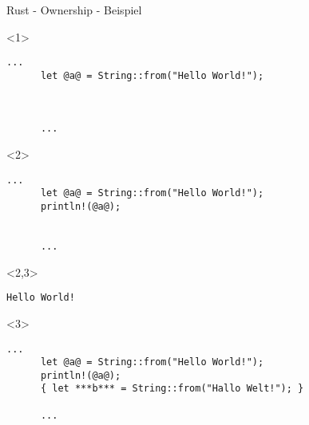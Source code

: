 

\lstset{showstringspaces=true,columns=fullflexible,keepspaces=true}

\begin{frame}[fragile]{Rust - Ownership - Beispiel}



  \begin{onlyenv}<1> {
    \begin{lstlisting}[frame=single,style=base]
      ...
      let @a@ = String::from("Hello World!");



      ...
    \end{lstlisting}
  }
  \end{onlyenv}


  \begin{onlyenv}<2> {
    \begin{lstlisting}[frame=single,style=base]
      ...
      let @a@ = String::from("Hello World!");
      println!(@a@);


      ...
    \end{lstlisting}
  }
  \end{onlyenv}

  \begin{onlyenv}<2,3> {
    \begin{lstlisting}[frame=single,style=base]
      Hello World!

    \end{lstlisting}
  }
  \end{onlyenv}


  \begin{onlyenv}<3> {
    \begin{lstlisting}[frame=single,style=base]
      ...
      let @a@ = String::from("Hello World!");
      println!(@a@);
      { let ***b*** = String::from("Hallo Welt!"); }

      ...
    \end{lstlisting}
  }
  \end{onlyenv}


\end{frame}
